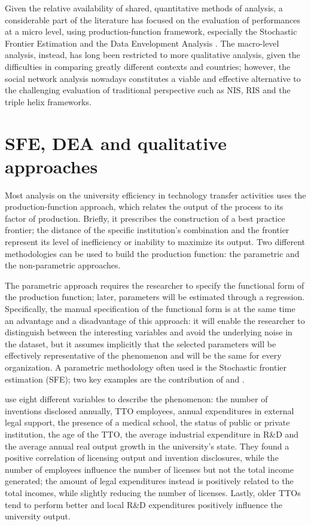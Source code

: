 Given the relative availability of shared, quantitative methods of analysis, a considerable part of the literature has focused on the evaluation of performances at a micro level, using production-function framework, especially the Stochastic Frontier Estimation and the Data Envelopment Analysis \citep{Siegel2007}. The macro-level analysis, instead, has long been restricted to more qualitative analysis, given the difficulties in comparing greatly different contexts and countries; however, the social network analysis nowadays constitutes a viable and effective alternative to the challenging evaluation of traditional perspective such as NIS, RIS and the triple helix frameworks.

\section{SFE, DEA and qualitative approaches}

Most analysis on the university efficiency in technology transfer activities uses the production-function approach, which relates the output of the process to its factor of production. Briefly, it prescribes the construction of a best practice frontier; the distance of the specific institution's combination and the frontier represent its level of inefficiency or inability to maximize its output. Two different methodologies can be used to build the production function: the parametric and the non-parametric approaches.

The parametric approach requires the researcher to specify the functional form of the production function; later, parameters will be estimated through a regression. Specifically, the manual specification of the functional form is at the same time an advantage and a disadvantage of this approach: it will enable the researcher to distinguish between the interesting variables and avoid the underlying noise in the dataset, but it assumes implicitly that the selected parameters will be effectively representative of the phenomenon and will be the same for every organization. A parametric methodology often used is the Stochastic frontier estimation (SFE); two key examples are the contribution of \citet{Siegel2003a} and \citet{Link2005}.

\citet{Siegel2003a} use eight different variables to describe the phenomenon: the number of inventions disclosed annually, TTO employees, annual expenditures in external legal support, the presence of a medical school, the status of public or private institution, the age of the TTO, the average industrial expenditure in R\&D and the average annual real output growth in the university's state. They found a positive correlation of licensing output and invention disclosures, while the number of employees influence the number of licenses but not the total income generated; the amount of legal expenditures instead is positively related to the total incomes, while slightly reducing the number of licenses. Lastly, older TTOs tend to perform better and local R\&D expenditures positively influence the university output. 

